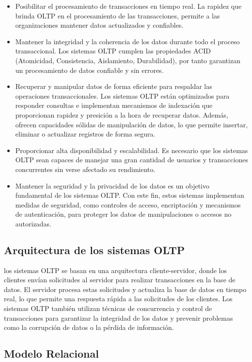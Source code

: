 \begin{itemize}
    \item Posibilitar el procesamiento de transacciones en tiempo real. La rapidez que brinda OLTP en el procesamiento de 
        las transacciones, permite a las organizaciones mantener datos actualizados y 
        confiables.

    \item Mantener la integridad y la coherencia de los datos durante todo el proceso transaccional. Los sistemas OLTP 
        cumplen las propiedades ACID (Atomicidad, Consistencia, Aislamiento, Durabilidad), por tanto garantizan un 
        procesamiento de datos confiable y sin errores.

    \item Recuperar y manipular datos de forma eficiente para respaldar las operaciones transaccionales. Los sistemas OLTP
        est\'an optimizados para responder consultas e implementan mecanismos de indexación que proporcionan rapidez y presici\'on 
        a la hora de recuperar datos. Adem\'as, ofrecen capacidades s\'olidas de manipulaci\'on de datos, lo que permite 
        insertar, eliminar o actualizar registros de forma segura.

    \item Proporcionar alta disponibilidad y escalabilidad. Es necesario que los sistemas OLTP sean capaces de manejar una 
        gran cantidad de usuarios y transacciones concurrentes sin verse afectado su rendimiento.

    \item Mantener la seguridad y la privacidad de los datos es un objetivo fundamental de los sistemas OLTP. Con este fin, 
        estos sistemas implementan medidas de seguridad, como controles de acceso, encriptación y mecanismos de autenticación, 
        para proteger los datos de manipulaciones o accesos no autorizadas.
\end{itemize}

\subsection{Arquitectura de los sistemas OLTP}

los sistemas OLTP se basan en una arquitectura cliente-servidor, donde los clientes envían 
solicitudes al servidor para realizar transacciones en la base de datos. El servidor procesa 
estas solicitudes y actualiza la base de datos en tiempo real, lo que permite una respuesta 
rápida a las solicitudes de los clientes. Los sistemas OLTP también utilizan técnicas de 
concurrencia y control de transacciones para garantizar la integridad de los datos y prevenir 
problemas como la corrupción de datos o la pérdida de información.

\subsection{Modelo Relacional}